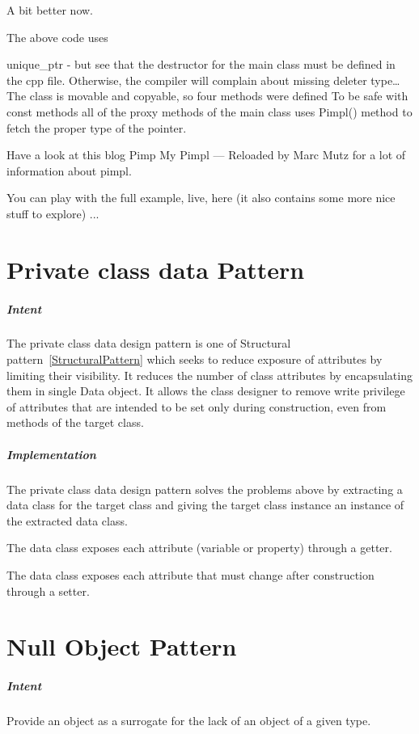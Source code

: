 \documentclass{book}
\begin{document}
A bit better now.

The above code uses

    unique\_ptr - but see that the destructor for the main class must be defined in the cpp file. Otherwise, the compiler will complain about missing deleter type…
    The class is movable and copyable, so four methods were defined
    To be safe with const methods all of the proxy methods of the main class uses Pimpl() method to fetch the proper type of the pointer.

Have a look at this blog Pimp My Pimpl — Reloaded by Marc Mutz for a lot of information about pimpl.

You can play with the full example, live, here (it also contains some more nice stuff to explore)
...

\chapter{Private class data Pattern}\label{PrivateClassDataPattern}
\paragraph{Intent}
The private class data design pattern is one of Structural pattern~\ref{StructuralPattern} which seeks to reduce exposure of attributes by limiting their visibility.
It reduces the number of class attributes by encapsulating them in single Data object.
It allows the class designer to remove write privilege of attributes that are intended to be set only during construction, even from methods of the target class.
\paragraph{Implementation}

The private class data design pattern solves the problems above by extracting a data class for the target class and giving the target class instance an instance of the extracted data class.

    The data class exposes each attribute (variable or property) through a getter.

    The data class exposes each attribute that must change after construction through a setter.

\chapter{Null Object Pattern}\label{NullObjectPattern}
\paragraph{Intent}
    Provide an object as a surrogate for the lack of an object of a given type.
\end{document}
